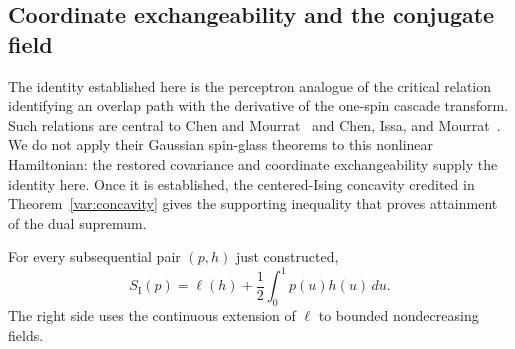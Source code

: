 \subsection{Coordinate exchangeability and the conjugate field}

The identity established here is the perceptron analogue of the
critical relation identifying an overlap path with the derivative of
the one-spin cascade transform. Such relations are central to Chen
and Mourrat~\cite[Propositions~7.2 and~7.3]{chenmourrat2025} and
Chen, Issa, and Mourrat~\cite[Theorem~6.1]{chenissamourrat2026}. We do not
apply their Gaussian spin-glass theorems to this nonlinear Hamiltonian:
the restored covariance and coordinate exchangeability supply the
identity here. Once it is established, the centered-Ising concavity
credited in Theorem~\ref{var:concavity} gives the supporting inequality
that proves attainment of the dual supremum.

\begin{proposition}
\label{cav:dual-attainment}
For every subsequential pair $(p,h)$ just constructed,
\begin{equation}\label{cav:entropy-identity}
 S_{\mathrm I}(p)=\ell(h)+\frac12\int_0^1p(u)h(u)\,du.
\end{equation}
The right side uses the continuous extension of $\ell$ to bounded
nondecreasing fields.
\end{proposition}

